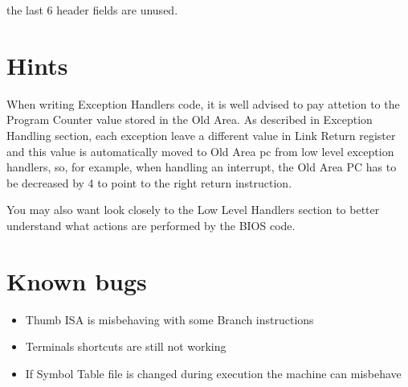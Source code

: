 the last 6 header fields are unused.

\section{Hints}

When writing Exception Handlers code, it is well advised to pay attetion to the Program Counter value stored in the Old Area. As described in Exception Handling section, each exception leave a different value in Link Return register and this value is automatically moved to Old Area pc from low level exception handlers, so, for example, when handling an interrupt, the Old Area PC has to be decreased by 4 to point to the right return instruction.

You may also want look closely to the Low Level Handlers section to better understand what actions are performed by the BIOS code.

\section{Known bugs}

\begin{itemize}
\item Thumb ISA is misbehaving with some Branch instructions
\item Terminals shortcuts are still not working
\item If Symbol Table file is changed during execution the machine can misbehave

\end{itemize}
